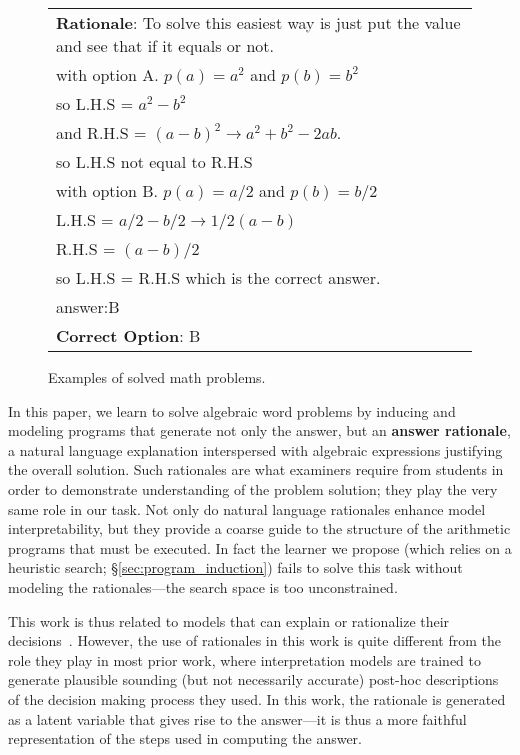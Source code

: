 \begin{figure}[t]
{\begin{tabular}{|p{75mm}|}
        \textbf{Rationale}: To solve this easiest way is just put the value and see that if it equals or not. \\ 
		with option A. $p(a) = a^2$ and $p(b) = b^2$ \\
		so L.H.S = $a^2 - b^2$ \\
		and R.H.S = $(a-b)^2 \rightarrow a^2 + b^2 -2ab$. \\
		so L.H.S not equal to R.H.S \\
		with option B. $p(a) = a/2$ and $p(b) = b/2$ \\ 
		L.H.S = $a/2 - b/2 \rightarrow 1/2(a-b)$ \\
		R.H.S = $(a-b)/2$ \\ 
		so L.H.S = R.H.S which is the correct answer. \\ 
		answer:B\\
		
		\textbf{Correct Option}: B \\
        \hline
        
        \end{tabular}
        
        }
        
        \caption{Examples of solved math problems.}
\label{fig:examples}
\end{figure}

In this paper, we learn to solve algebraic word problems by inducing and modeling programs that generate not only the answer, but an \textbf{answer rationale}, a natural language explanation interspersed with algebraic expressions justifying the overall solution. Such rationales are what examiners require from students in order to demonstrate understanding of the problem solution; they play the very same role in our task. Not only do natural language rationales enhance model interpretability, but they provide a coarse guide to the structure of the arithmetic programs that must be executed. In fact the learner we propose (which relies on a heuristic search; \S\ref{sec:program_induction})
fails to solve this task without modeling the rationales---the search space is too unconstrained.

This work is thus related to models that can explain or rationalize their decisions~\citep{hendricks:2016,DBLP:journals/corr/HarrisonER17}. However, the use of rationales in this work is quite different from the role they play in most prior work, where interpretation models are trained to generate plausible sounding (but not necessarily accurate) post-hoc descriptions of the decision making process they used. In this work, the rationale is generated as a latent variable that gives rise to the answer---it is thus a more faithful representation of the steps used in computing the answer.


